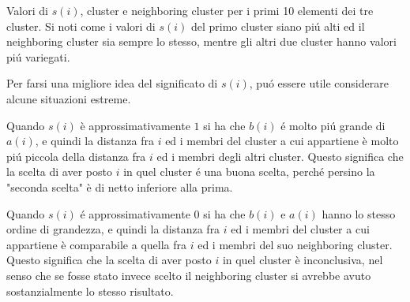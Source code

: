 \documentclass[italian]{article}
\begin{document}
		\begin{table}
			\begin{boxedminipage}{0.25\linewidth}
			\end{boxedminipage}
			\begin{boxedminipage}{0.25\linewidth}
			\end{boxedminipage}
			\begin{boxedminipage}{0.25\linewidth}
			\end{boxedminipage}
			\caption{Valori di $s(i)$, cluster e neighboring cluster per
			i primi 10 elementi dei tre cluster. Si noti come i valori
			di $s(i)$ del primo cluster siano piú alti ed il neighboring
			cluster sia sempre lo stesso, mentre gli altri due cluster
			hanno valori piú variegati.}
			\label{tab:iris}
		\end{table}

		Per farsi una migliore idea del significato di $s(i)$, puó essere
		utile considerare alcune situazioni estreme.

		Quando $s(i)$ è approssimativamente $1$ si ha che $b(i)$ é molto
		piú grande di $a(i)$, e quindi la distanza fra $i$ ed i membri del
		cluster a cui appartiene è molto piú piccola della distanza fra $i$
		ed i membri degli altri cluster. Questo significa che la scelta di
		aver posto $i$ in quel cluster é una buona scelta, perché persino
		la "seconda scelta" è di netto inferiore alla prima.

		Quando $s(i)$ é approssimativamente $0$ si ha che $b(i)$ e $a(i)$
		hanno lo stesso ordine di grandezza, e quindi la distanza fra $i$
		ed i membri del cluster a cui appartiene è comparabile a quella
		fra $i$ ed i membri del suo neighboring cluster. Questo significa
		che la scelta di aver posto $i$ in quel cluster è inconclusiva,
		nel senso che se fosse stato invece scelto il neighboring cluster
		si avrebbe avuto sostanzialmente lo stesso risultato.
\end{document}
